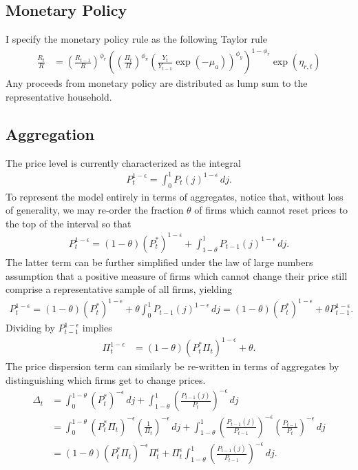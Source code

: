 \documentclass[12 pt, oneside]{article}
\theoremstyle{definition}
\theoremstyle{definition}
\theoremstyle{definition}
\begin{document}
\subsection{Monetary Policy}
I specify the monetary policy rule as the following Taylor rule
\begin{align}\label{eq:taylor rule}
  \frac{R_t}{R} & =  \left(\frac{R_{t - 1}}{R}\right)^{\phi_r}\left(\left(\frac{\Pi_t}{\Pi}\right)^{\phi_\pi}\left(\frac{Y_t}{Y_{t - 1}}\exp(-\mu_a)\right)^{\phi_y}\right)^{1 - \phi_r}\exp(\eta_{r, t})
\end{align}
Any proceeds from monetary policy are distributed as lump sum to the representative household.

\subsection{Aggregation}
The price level is currently characterized as the integral
\begin{align*}
  P_t^{1 - \epsilon} = \int_0^1 P_t(j)^{1 - \epsilon}\, dj.
\end{align*}
To represent the model entirely in terms of aggregates, notice that, without loss of generality, we may re-order the fraction $\theta$ of firms which cannot reset prices to the top of the interval so that
\begin{align*}
  P_t^{1 - \epsilon} = (1 - \theta)(P_t^*)^{1 - \epsilon} +  \int_{1 - \theta}^1 P_{t - 1}(j)^{1 - \epsilon}\, dj.
\end{align*}
The latter term can be further simplified under the law of large numbers assumption that a positive measure of firms which cannot change their price
still comprise a representative sample of all firms, yielding
\begin{align*}
  P_t^{1 - \epsilon} = (1 - \theta)(P_t^*)^{1 - \epsilon} +  \theta\int_0^1 P_{t - 1}(j)^{1 - \epsilon}\, dj = (1 - \theta)(P_t^*)^{1 - \epsilon} +  \theta P_{t - 1}^{1 - \epsilon}.
\end{align*}
Dividing by $P_{t - 1}^{1 - \epsilon}$ implies
\begin{align}\label{eq:inflation from optimal reset price}
  \Pi_t^{ 1 - \epsilon} & = (1 - \theta) (P_t^*\Pi_t)^{1 - \epsilon} + \theta.
\end{align}
The price dispersion term can similarly be re-written in terms of aggregates by distinguishing which firms get to change prices.
\begin{align*}
  \Delta_t & = \int_0^{1 - \theta}\left(P_t^*\right)^{ - \epsilon}\, dj + \int_{1 - \theta}^1 \left(\frac{P_{t - 1}(j)}{P_t}\right)^{ - \epsilon}\, dj\\
      & = \int_0^{1 - \theta}\left(P_t^*\Pi_t\right)^{ - \epsilon}\left(\frac{1}{\Pi_t}\right)^{ - \epsilon}\, dj + \int_{1 - \theta}^1 \left(\frac{P_{t - 1}(j)}{P_{t - 1}}\right)^{ - \epsilon}\left(\frac{P_{t - 1}}{P_t}\right)^{ - \epsilon}\, dj\\
      & = (1 - \theta) (P_t^*\Pi_t)^{-\epsilon} \Pi_t^{\epsilon}  + \Pi_t^{\epsilon} \int_{1 - \theta}^1 \left(\frac{P_{t - 1}(j)}{P_{t - 1}}\right)^{ - \epsilon}\,dj.
\end{align*}
\end{document}
